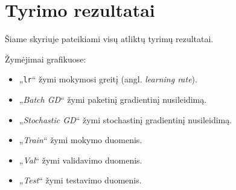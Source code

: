 \section{Tyrimo rezultatai}
\label{sec:tyrimo_rezultatai}

Šiame skyriuje pateikiami visų atliktų tyrimų rezultatai.
\vspace{10pt}

Žymėjimai grafikuose:
\begin{itemize}
    \item „\texttt{lr}“ žymi mokymosi greitį (angl. \textit{learning rate}).
    \item „\textit{Batch GD}“ žymi paketinį gradientinį nusileidimą.
    \item „\textit{Stochastic GD}“ žymi stochastinį gradientinį nusileidimą.
    \item „\textit{Train}“ žymi mokymo duomenis.
    \item „\textit{Val}“ žymi validavimo duomenis.
    \item „\textit{Test}“ žymi testavimo duomenis.
\end{itemize}




